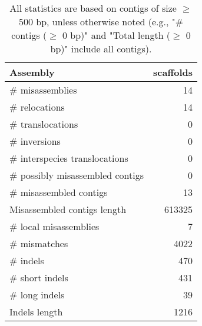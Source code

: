 \documentclass[12pt,a4paper]{article}
\begin{document}
\begin{table}[ht]
\begin{center}
\caption{All statistics are based on contigs of size $\geq$ 500 bp, unless otherwise noted (e.g., "\# contigs ($\geq$ 0 bp)" and "Total length ($\geq$ 0 bp)" include all contigs).}
\begin{tabular}{|l*{1}{|r}|}
\hline
Assembly & scaffolds \\ \hline
\# misassemblies & 14 \\ \hline
\hspace{5mm}\# relocations & 14 \\ \hline
\hspace{5mm}\# translocations & 0 \\ \hline
\hspace{5mm}\# inversions & 0 \\ \hline
\hspace{5mm}\# interspecies translocations & 0 \\ \hline
\# possibly misassembled contigs & 0 \\ \hline
\# misassembled contigs & 13 \\ \hline
Misassembled contigs length & 613325 \\ \hline
\# local misassemblies & 7 \\ \hline
\# mismatches & 4022 \\ \hline
\# indels & 470 \\ \hline
\hspace{5mm}\# short indels & 431 \\ \hline
\hspace{5mm}\# long indels & 39 \\ \hline
Indels length & 1216 \\ \hline
\end{tabular}
\end{center}
\end{table}
\end{document}
